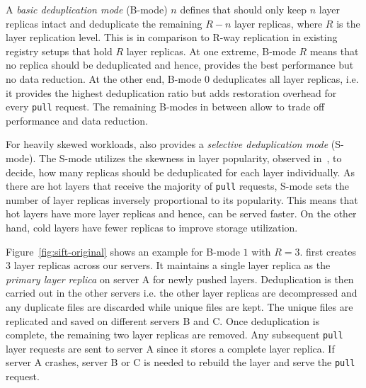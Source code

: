 A \emph{basic deduplication mode} (B-mode) $n$ defines that \sysname should only
keep $n$ layer replicas intact and deduplicate the remaining $R-n$ layer
replicas, where $R$ is the layer replication level. This is in comparison to R-way replication in existing registry setups that hold $R$ layer replicas.
%
%
At one extreme, B-mode $R$ means that no replica should be deduplicated and
hence, provides the best performance but no data reduction.
%
At the other end, B-mode $0$ deduplicates all layer replicas, i.e. it provides
the highest deduplication ratio but adds restoration overhead for every
\texttt{pull} request.
%
The remaining B-modes in between allow to trade off performance and data
reduction.
%

 

For heavily skewed workloads, \sysname also provides a \emph{selective
deduplication mode} (S-mode).
%
The S-mode utilizes the skewness in layer popularity, observed
in~\cite{dockerworkload}, to decide, how many replicas should be deduplicated
for each layer individually.
%
As there are hot layers that receive the majority of \texttt{pull} requests,
S-mode sets the number of layer replicas inversely proportional to its
popularity.
%
This means that hot layers have more layer replicas and
hence, can be served faster.
%
On the other hand, cold layers have fewer replicas to improve storage utilization.

Figure~\ref{fig:sift-original} shows an example for B-mode $1$ with $R=3$.
\sysname first creates 3 layer replicas across our servers. It maintains a single layer replica as the \emph{primary layer replica} on
server A for newly pushed layers.
%
Deduplication is then carried out in the other servers i.e. the other layer replicas are decompressed and any duplicate
files are discarded while unique files are kept.  The unique files are replicated
and saved on different servers B and C. Once deduplication is complete, the remaining two layer replicas are removed. 
%
Any subsequent \texttt{pull} layer requests are sent to server A since it
stores a complete layer replica.
%
If server A crashes, server B or C is needed to rebuild the layer and serve the
\texttt{pull} request.
%
%

